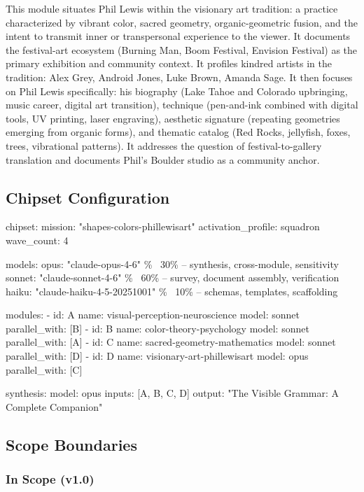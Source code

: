 \documentclass[11pt,letterpaper]{article}
\begin{document}
This module situates Phil Lewis within the visionary art tradition: a practice characterized by vibrant color, sacred geometry, organic-geometric fusion, and the intent to transmit inner or transpersonal experience to the viewer. It documents the festival-art ecosystem (Burning Man, Boom Festival, Envision Festival) as the primary exhibition and community context. It profiles kindred artists in the tradition: Alex Grey, Android Jones, Luke Brown, Amanda Sage. It then focuses on Phil Lewis specifically: his biography (Lake Tahoe and Colorado upbringing, music career, digital art transition), technique (pen-and-ink combined with digital tools, UV printing, laser engraving), aesthetic signature (repeating geometries emerging from organic forms), and thematic catalog (Red Rocks, jellyfish, foxes, trees, vibrational patterns). It addresses the question of festival-to-gallery translation and documents Phil's Boulder studio as a community anchor.

\subsection{Chipset Configuration}

\begin{asciibox}
chipset:
  mission: "shapes-colors-phillewisart"
  activation\_profile: squadron
  wave\_count: 4

models:
  opus:   "claude-opus-4-6"       \% ~{}30\% -- synthesis, cross-module, sensitivity
  sonnet: "claude-sonnet-4-6"     \% ~{}60\% -- survey, document assembly, verification
  haiku:  "claude-haiku-4-5-20251001"  \% ~{}10\% -- schemas, templates, scaffolding

modules:
  - id: A
    name: visual-perception-neuroscience
    model: sonnet
    parallel\_with: [B]
  - id: B
    name: color-theory-psychology
    model: sonnet
    parallel\_with: [A]
  - id: C
    name: sacred-geometry-mathematics
    model: sonnet
    parallel\_with: [D]
  - id: D
    name: visionary-art-phillewisart
    model: opus
    parallel\_with: [C]

synthesis:
  model: opus
  inputs: [A, B, C, D]
  output: "The Visible Grammar: A Complete Companion"
\end{asciibox}

\subsection{Scope Boundaries}

\subsubsection{In Scope (v1.0)}
\end{document}
